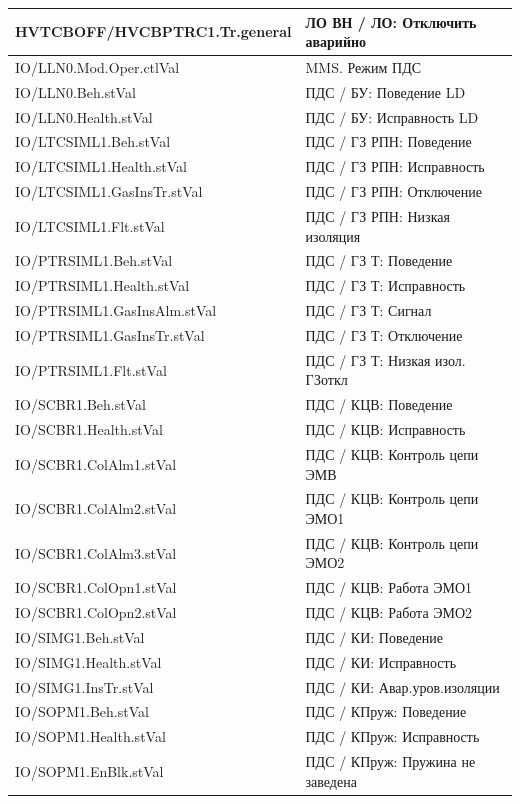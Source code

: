 \begin{longtable}{|>{\raggedright\arraybackslash}m{}|>{\raggedright\arraybackslash}m{}|}
\hline
HVTCBOFF/HVCBPTRC1.Tr.general & ЛО ВН / ЛО: Отключить аварийно \\
\hline
IO/LLN0.Mod.Oper.ctlVal & MMS. Режим ПДС \\
\hline
IO/LLN0.Beh.stVal & ПДС / БУ: Поведение LD \\
\hline
IO/LLN0.Health.stVal & ПДС / БУ: Исправность LD \\
\hline
IO/LTCSIML1.Beh.stVal & ПДС / ГЗ РПН: Поведение \\
\hline
IO/LTCSIML1.Health.stVal & ПДС / ГЗ РПН: Исправность \\
\hline
IO/LTCSIML1.GasInsTr.stVal & ПДС / ГЗ РПН: Отключение \\
\hline
IO/LTCSIML1.Flt.stVal & ПДС / ГЗ РПН: Низкая изоляция \\
\hline
IO/PTRSIML1.Beh.stVal & ПДС / ГЗ Т: Поведение \\
\hline
IO/PTRSIML1.Health.stVal & ПДС / ГЗ Т: Исправность \\
\hline
IO/PTRSIML1.GasInsAlm.stVal & ПДС / ГЗ Т: Сигнал \\
\hline
IO/PTRSIML1.GasInsTr.stVal & ПДС / ГЗ Т: Отключение \\
\hline
IO/PTRSIML1.Flt.stVal & ПДС / ГЗ Т: Низкая изол. ГЗоткл \\
\hline
IO/SCBR1.Beh.stVal & ПДС / КЦВ: Поведение \\
\hline
IO/SCBR1.Health.stVal & ПДС / КЦВ: Исправность \\
\hline
IO/SCBR1.ColAlm1.stVal & ПДС / КЦВ: Контроль цепи ЭМВ \\
\hline
IO/SCBR1.ColAlm2.stVal & ПДС / КЦВ: Контроль цепи ЭМО1 \\
\hline
IO/SCBR1.ColAlm3.stVal & ПДС / КЦВ: Контроль цепи ЭМО2 \\
\hline
IO/SCBR1.ColOpn1.stVal & ПДС / КЦВ: Работа ЭМО1 \\
\hline
IO/SCBR1.ColOpn2.stVal & ПДС / КЦВ: Работа ЭМО2 \\
\hline
IO/SIMG1.Beh.stVal & ПДС / КИ: Поведение \\
\hline
IO/SIMG1.Health.stVal & ПДС / КИ: Исправность \\
\hline
IO/SIMG1.InsTr.stVal & ПДС / КИ: Авар.уров.изоляции \\
\hline
IO/SOPM1.Beh.stVal & ПДС / КПруж: Поведение \\
\hline
IO/SOPM1.Health.stVal & ПДС / КПруж: Исправность \\
\hline
IO/SOPM1.EnBlk.stVal & ПДС / КПруж: Пружина не заведена \\
\hline

\end{longtable}
